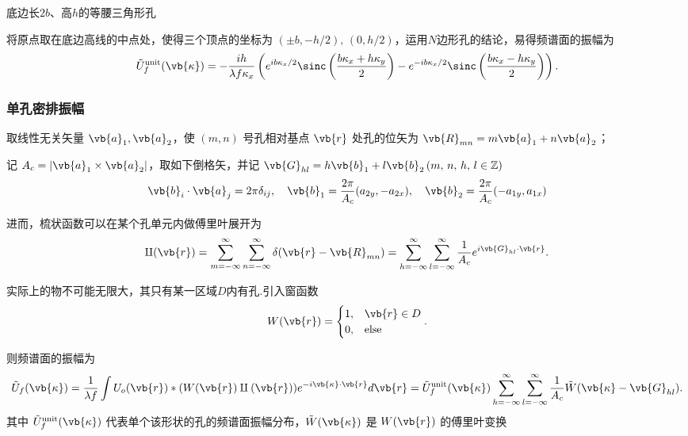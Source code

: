 \begin{example}
	底边长\(2b\)、高\(h\)的等腰三角形孔

	将原点取在底边高线的中点处，使得三个顶点的坐标为 \((\pm b, -h/2),\,(0, h/2)\)，运用\(N\)边形孔的结论，易得频谱面的振幅为
	\begin{equation*}
		\tilde{U}_f^{\text{unit}}(\vb{\kappa}) = -\frac{i h}{\lambda f \kappa_x} \left( e^{i b \kappa_x/2} \sinc\left(\frac{b \kappa_x + h \kappa_y}{2}\right) -  e^{-i b \kappa_x/2} \sinc\left(\frac{b \kappa_x - h \kappa_y}{2}\right) \right).
	\end{equation*}
\end{example}

\subsubsection{单孔密排振幅}

取线性无关矢量 \(\vb{a}_1, \vb{a}_2\)，使 \((m, n)\) 号孔相对基点 \(\vb{r}\) 处孔的位矢为 \(\vb{R}_{mn} = m \vb{a}_1 + n \vb{a}_2\)；

记 \(A_c = |\vb{a}_1 \times \vb{a}_2|\)，取如下倒格矢，并记 \(\vb{G}_{hl} = h \vb{b}_1 + l \vb{b}_2\,(m,\,n,\,h,\,l\in \mathbb{Z})\)
\begin{equation*}
	\vb{b}_i \cdot \vb{a}_j = 2\pi \delta_{ij}, \quad \vb{b}_1 = \frac{2\pi}{A_c} (a_{2y}, -a_{2x}), \quad \vb{b}_2 = \frac{2\pi}{A_c} (-a_{1y}, a_{1x})
\end{equation*}


进而，梳状函数可以在某个孔单元内做傅里叶展开为
\begin{equation*}
	\amalg(\vb{r}) = \sum_{m=-\infty}^{\infty} \sum_{n=-\infty}^{\infty} \delta(\vb{r} - \vb{R}_{mn}) = \sum_{h=-\infty}^{\infty} \sum_{l=-\infty}^{\infty} \frac{1}{A_c} e^{i \vb{G}_{hl} \cdot \vb{r}}.
\end{equation*}

实际上的物不可能无限大，其只有某一区域\(D\)内有孔.引入窗函数
\begin{equation*}
	W(\vb{r}) =
	\begin{cases}
		1, & \vb{r} \in D \\
		0, & \text{else}
	\end{cases}.
\end{equation*}

则频谱面的振幅为
\begin{equation*}
	\tilde{U}_f(\vb{\kappa}) = \frac{1}{\lambda f} \int U_o(\vb{r}) * (W(\vb{r}) \amalg(\vb{r})) e^{-i \vb{\kappa} \cdot \vb{r}} d\vb{r} = \tilde{U}_f^{\text{unit}}(\vb{\kappa}) \sum_{h=-\infty}^{\infty} \sum_{l=-\infty}^{\infty} \frac{1}{A_c} \tilde{W}(\vb{\kappa} - \vb{G}_{hl}).
\end{equation*}
其中 \(\tilde{U}_f^{\text{unit}}(\vb{\kappa})\) 代表单个该形状的孔的频谱面振幅分布，\(\tilde{W}(\vb{\kappa})\) 是 \(W(\vb{r})\) 的傅里叶变换

